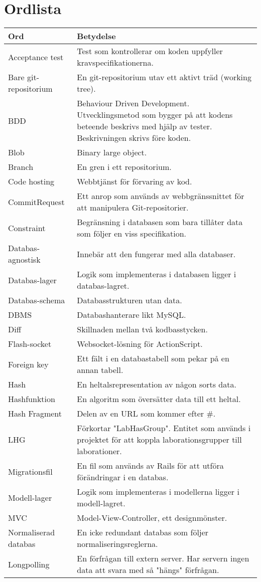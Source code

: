 \section{Ordlista}
\label{sec:ordlista}
\small
\begin{tabular} { | l | p{10cm} | }
\hline
\bf{Ord} & \bf{Betydelse} \\
\hline
Acceptance test	& Test som kontrollerar om koden uppfyller kravspecifikationerna. \\
\hline
Bare git-repositorium & En git-repositorium utav ett aktivt träd (working tree). \\
\hline
BDD & Behaviour Driven Development. Utvecklingsmetod som bygger på att kodens
beteende beskrivs med hjälp av tester. Beskrivningen skrivs före koden. \\
\hline
Blob & Binary large object.\\
\hline
Branch & En gren i ett repositorium. \\
\hline
Code hosting & Webbtjänst för förvaring av kod. \\
\hline
CommitRequest & Ett anrop som används av webbgränssnittet för att manipulera Git-repositorier. \\
\hline
Constraint & Begränsning i databasen som bara tillåter data som följer en viss specifikation. \\
\hline
Databas-agnostisk & Innebär att den fungerar med alla databaser. \\
\hline
Databas-lager & Logik som implementeras i databasen ligger i databas-lagret. \\
\hline
Databas-schema & Databasstrukturen utan data. \\
\hline
DBMS & Databashanterare likt MySQL. \\
\hline
Diff & Skillnaden mellan två kodbasstycken. \\
\hline
Flash-socket & Websocket-lösning för ActionScript. \\
\hline
Foreign key & Ett fält i en databastabell som pekar på en annan tabell. \\
\hline
Hash & En heltalsrepresentation av någon sorts data. \\
\hline
Hashfunktion & En algoritm som översätter data till ett heltal. \\
\hline
Hash Fragment & Delen av en URL som kommer efter \#. \\
\hline
LHG & Förkortar "LabHasGroup". Entitet som används i projektet för att koppla laborationsgrupper till laborationer. \\
\hline
Migrationsfil & En fil som används av Rails för att utföra förändringar i en databas. \\
\hline
Modell-lager & Logik som implementeras i modellerna ligger i modell-lagret. \\
\hline
MVC & Model-View-Controller, ett designmönster. \\
\hline
Normaliserad databas & En icke redundant databas som följer normaliseringsreglerna. \\
\hline
Longpolling & En förfrågan till extern server. Har servern ingen data att svara med så "hängs" förfrågan. \\
\hline
\end{tabular}

